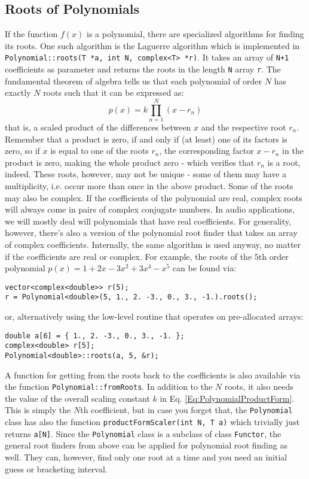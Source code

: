\subsection{Roots of Polynomials}
If the function $f(x)$ is a polynomial, there are specialized algorithms for finding its roots. One such algorithm is the Laguerre algorithm which is implemented in \texttt{Polynomial::roots(T *a, int N, complex<T> *r)}. It takes an array of \texttt{N+1} coefficients as parameter and returns the roots in the length \texttt{N} array \texttt{r}. The fundamental theorem of algebra tells us that each polynomial of order $N$ has exactly $N$ roots such that it can be expressed as:
\begin{equation}
  \label{Eq:PolynomialProductForm}
	p(x) = k \prod_{n=1}^N (x - r_n)
\end{equation}
that is, a scaled product of the differences between $x$ and the respective root $r_n$. Remember that a product is zero, if and only if (at least) one of its factors is zero, so if $x$ is equal to one of the roots $r_n$, the corresponding factor $x - r_n$ in the product is zero, making the whole product zero - which verifies that $r_n$ is a root, indeed. These roots, however, may not be unique - some of them may have a multiplicity, i.e. occur more than once in the above product. Some of the roots may also be complex. If the coefficients of the polynomial are real, complex roots will always come in pairs of complex conjugate numbers. In audio applications, we will mostly deal will polynomials that have real coefficients. For generality, however, there's also a version of the polynomial root finder that takes an array of complex coefficients. Internally, the same algorithm is used anyway, no matter if the coefficients are real or complex. For example, the roots of the $5$th order polynomial $p(x) = 1 + 2 x - 3 x^2 + 3 x^4 - x^5$ can be found via:
\begin{lstlisting}
vector<complex<double>> r(5);
r = Polynomial<double>(5, 1., 2. -3., 0., 3., -1.).roots();
\end{lstlisting}
or, alternatively using the low-level routine that operates on pre-allocated arrays:
\begin{lstlisting}
double a[6] = { 1., 2. -3., 0., 3., -1. };
complex<double> r[5];
Polynomial<double>::roots(a, 5, &r);
\end{lstlisting}
A function for getting from the roots back to the coefficients is also available via the function \texttt{Polynomial::fromRoots}. In addition to the $N$ roots, it also needs the value of the overall scaling constant $k$ in Eq. \ref{Eq:PolynomialProductForm}. This is simply the $N$th coefficient, but in case you forget that, the \texttt{Polynomial} class has also the function \texttt{productFormScaler(int N, T a)} which trivially just returns \texttt{a[N]}. Since the \texttt{Polynomial} class is a subclass of class \texttt{Functor}, the general root finders from above can be applied for polynomial root finding as well. They can, however, find only one root at a time and you need an initial guess or bracketing interval.


